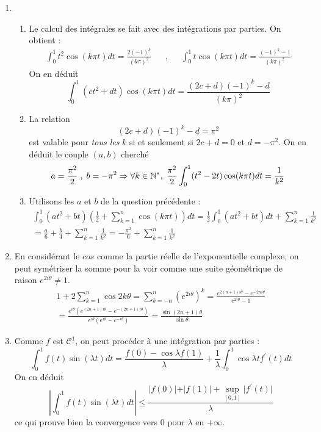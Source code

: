 \begin{enumerate}
 \item \begin{enumerate}
 \item Le calcul des intégrales se fait avec des intégrations par parties. On obtient :
\begin{align*}
 \int_0^1 t^2\cos(k\pi t) dt = \frac{2(-1)^k}{(k\pi)^2} & &, & &
\int_0^1 t\cos(k\pi t) dt = \frac{(-1)^k-1}{(k\pi)^2}
\end{align*}
On en déduit
\[\int_0^1 (ct^2 +dt)\cos(k\pi t) dt = \frac{(2c+d)(-1)^k-d}{(k\pi)^2}\]
\item La relation 
\[(2c+d)(-1)^k-d=\pi^2\]
est valable pour \emph{tous les} $k$ si et seulement si $2c+d=0$ et $d=-\pi^2$. On en déduit le couple $(a,b)$ cherché
\begin{displaymath}
  a=\frac{\pi^2}{2}\;,\;b=-\pi^2
\Rightarrow
\forall k\in \mathbb{N}^*,\; \frac{\pi^2}{2}\int_0^1 (t^2 -2t)\cos(k\pi t) dt =\frac{1}{k^2}
\end{displaymath}

\item Utilisons les $a$ et $b$ de la question précédente :
\begin{multline*}
 \int_0 ^1(at^2+bt)\left( \frac{1}{2} + \sum_{k=1}^n \cos (k\pi t)\right) dt 
= \frac{1}{2}\int_0 ^1(at^2+bt)dt + \sum_{k=1}^n \frac{1}{k^2} \\
= \frac{a}{6}+\frac{b}{4} + \sum_{k=1}^n \frac{1}{k^2} 
= -\frac{\pi^2}{6} + \sum_{k=1}^n \frac{1}{k^2}
\end{multline*}

\end{enumerate}
\item En considérant le $cos$ comme la partie réelle de l'exponentielle complexe, on peut symétriser la somme pour la voir comme une suite géométrique de raison $e^{2i\theta}\neq1$.
\begin{multline*}
 1+2\sum_{k=1}^n\cos 2k\theta
  = \sum_{k=-n}^{n} \left( e^{2i\theta}\right)^k
  =\frac{e^{2(n+1)i\theta} - e^{-2ni\theta}}{e^{2i\theta} - 1}\\
  =\frac{e^{i\theta}\left( e^{(2n+1)i\theta} - e^{-(2n+1)i\theta}\right)}{e^{i\theta}\left( e^{i\theta} - e^{-i\theta}\right) }
  = \frac{\sin(2n+1)\theta}{\sin \theta}
\end{multline*}

\item Comme $f$ est $\mathcal{C}^1$, on peut procéder à une intégration par parties :
\[\int_0^1f(t)\sin (\lambda t)dt=\frac{f(0)-\cos \lambda f(1)}{\lambda} + \frac{1}{\lambda} \int_0 ^1 \cos \lambda t f^\prime (t)dt\]
On en déduit
\[\left \vert \int_0^1f(t)\sin (\lambda t)dt \right\vert \leq \frac{\vert f(0)\vert + \vert f(1)\vert + \underset{[0,1]}{\sup}\vert f^\prime(t)\vert }{\lambda}\]
ce qui prouve bien la convergence vers $0$ pour $\lambda$ en $+\infty$.


\end{enumerate}
